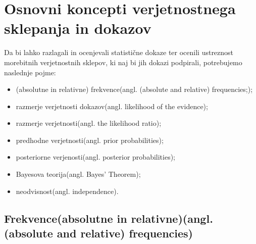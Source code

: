 \documentclass[12pt,a4paper]{amsart}
\theoremstyle{definition} %
\theoremstyle{plain} %
\begin{document}
\section{Osnovni koncepti verjetnostnega sklepanja in dokazov}
Da bi lahko razlagali in ocenjevali statistične dokaze ter ocenili ustreznost morebitnih verjetnostnih sklepov, ki naj bi jih dokazi podpirali, potrebujemo naslednje pojme:
\begin{itemize}
    \item (absolutne in relativne) frekvence(angl. (absolute and relative) frequencies;);
    \item razmerje verjetnosti dokazov(angl. likelihood of the evidence);
    \item razmerje verjetnosti(angl. the likelihood ratio);
    \item predhodne verjetnosti(angl. prior probabilities);
    \item posteriorne verjenosti(angl. posterior probabilities);
    \item Bayesova teorija(angl. Bayes’ Theorem);
    \item neodvisnost(angl. independence).
\end{itemize}

\subsection{Frekvence(absolutne in relativne)(angl. (absolute and relative) frequencies)}




\end{document}

